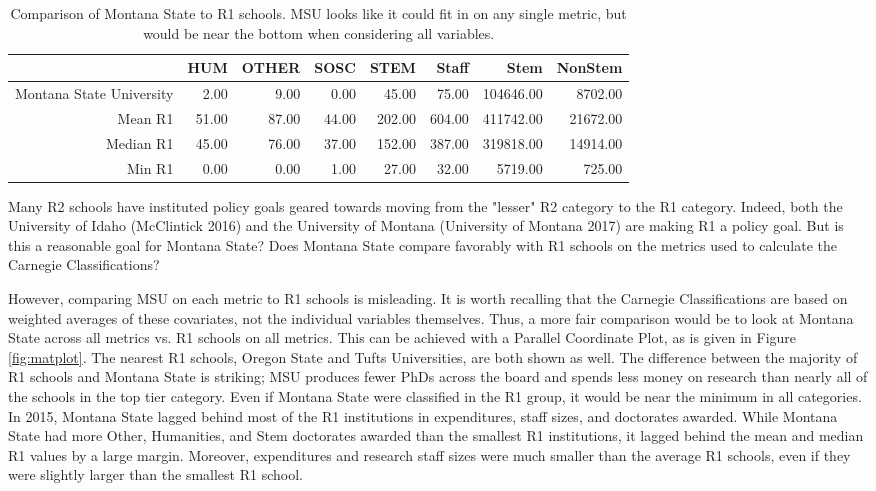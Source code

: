 \documentclass{article}
\begin{document}
\begin{table}[ht]
\centering
\begin{tabular}{|rrrrrrrr|}
  \hline
 & HUM & OTHER & SOSC & STEM & Staff & Stem & NonStem \\ 
  \hline
Montana State University & 2.00 & 9.00 & 0.00 & 45.00 & 75.00 & 104646.00 & 8702.00 \\ 
  Mean R1 & 51.00 & 87.00 & 44.00 & 202.00 & 604.00 & 411742.00 & 21672.00 \\ 
  Median R1 & 45.00 & 76.00 & 37.00 & 152.00 & 387.00 & 319818.00 & 14914.00 \\ 
  Min R1 & 0.00 & 0.00 & 1.00 & 27.00 & 32.00 & 5719.00 & 725.00 \\ 
   \hline
\end{tabular}
\caption{\label{tab:r1} Comparison of Montana State to R1 schools. MSU looks like it could fit in on any single metric, but would be near the bottom when considering all variables. }
\end{table}

Many R2 schools have instituted policy goals geared towards moving from the "lesser" R2 category to the R1 category. Indeed, both the University of Idaho (McClintick 2016) and the University of Montana (University of Montana 2017) are making R1 a policy goal. But is this a reasonable goal for Montana State? Does Montana State compare favorably with R1 schools on the metrics used to calculate the Carnegie Classifications? 

However, comparing MSU on each metric to R1 schools is misleading. It is worth recalling that the Carnegie Classifications are based on weighted averages of these covariates, not the individual variables themselves. Thus, a more fair comparison would be to look at Montana State across all metrics vs. R1 schools on all metrics. This can be achieved with a Parallel Coordinate Plot, as is given in Figure \ref{fig:matplot}. The nearest R1 schools, Oregon State and Tufts Universities, are both shown as well. The difference between the majority of R1 schools and Montana State is striking; MSU produces fewer PhDs across the board and spends less money on research than nearly all of the schools in the top tier category. Even if Montana State were classified in the R1 group, it would be near the minimum in all categories. In 2015, Montana State lagged behind most of the R1 institutions in expenditures, staff sizes, and doctorates awarded. While Montana State had more Other, Humanities, and Stem doctorates awarded than the smallest R1 institutions, it lagged behind the mean and median R1 values by a large margin. Moreover, expenditures and research staff sizes were much smaller than the average R1 schools, even if they were slightly larger than the smallest R1 school.
\end{document}
